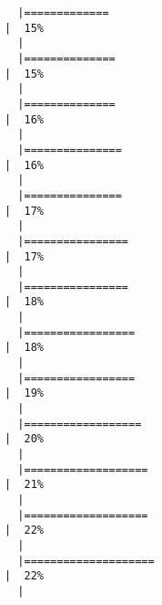 \documentclass[12pt]{article}
\begin{document}
\begin{verbatim}
  |=============                                                                             |  15%
  |                                                                                                
  |==============                                                                            |  15%
  |                                                                                                
  |==============                                                                            |  16%
  |                                                                                                
  |===============                                                                           |  16%
  |                                                                                                
  |===============                                                                           |  17%
  |                                                                                                
  |================                                                                          |  17%
  |                                                                                                
  |================                                                                          |  18%
  |                                                                                                
  |=================                                                                         |  18%
  |                                                                                                
  |=================                                                                         |  19%
  |                                                                                                
  |==================                                                                        |  20%
  |                                                                                                
  |===================                                                                       |  21%
  |                                                                                                
  |===================                                                                       |  22%
  |                                                                                                
  |====================                                                                      |  22%
  |                                                                                                

\end{verbatim}
\end{document}
